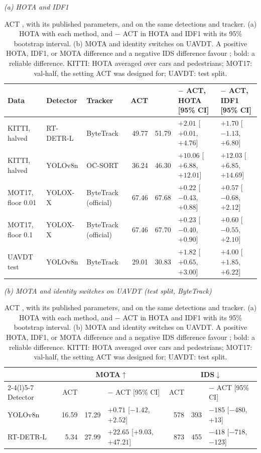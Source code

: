 \begin{table}[!tp]
\caption{ACT \cite{act2026adaptive}, with its published parameters, and \scl{} on the same detections and tracker. (a) HOTA with each method, and \scl{} $-$ ACT in HOTA and IDF1 with its 95\% bootstrap interval. (b) MOTA and identity switches on UAVDT. A positive HOTA, IDF1, or MOTA difference and a negative IDS difference favour \scl{}; bold: a reliable difference. KITTI: HOTA averaged over cars and pedestrians; MOT17: val-half, the setting ACT was designed for; UAVDT: test split.}
\label{tab:act}
\centering\footnotesize
\setlength{\tabcolsep}{3pt}
{\textit{(a) HOTA and IDF1}}\par\smallskip
\begin{tabular}{@{}lllrrll@{}}
\toprule
Data & Detector & Tracker & ACT & \scl{} & \scl{} $-$ ACT, HOTA [95\% CI] & \scl{} $-$ ACT, IDF1 [95\% CI]\\
\midrule
KITTI, halved & RT-DETR-L & ByteTrack & 49.77 & 51.79 & {\boldmath $+2.01$ [$+0.01$, $+4.76$]} & $+1.70$ [$-1.13$, $+6.80$]\\
KITTI, halved & YOLOv8n & OC-SORT & 36.24 & 46.30 & {\boldmath $+10.06$ [$+6.88$, $+12.01$]} & {\boldmath $+12.03$ [$+6.85$, $+14.69$]}\\
\addlinespace[2pt]
MOT17, floor 0.01 & YOLOX-X & ByteTrack (official) & 67.46 & 67.68 & $+0.22$ [$-0.43$, $+0.88$] & $+0.57$ [$-0.68$, $+2.12$]\\
MOT17, floor 0.1 & YOLOX-X & ByteTrack (official) & 67.46 & 67.70 & $+0.23$ [$-0.40$, $+0.90$] & $+0.60$ [$-0.55$, $+2.10$]\\
\addlinespace[2pt]
UAVDT test & YOLOv8n & ByteTrack & 29.01 & 30.83 & {\boldmath $+1.82$ [$+0.65$, $+3.00$]} & {\boldmath $+4.00$ [$+1.85$, $+6.22$]}\\
\bottomrule
\end{tabular}

\medskip
{\textit{(b) MOTA and identity switches on UAVDT (test split, ByteTrack)}}\par\smallskip
\begin{tabular}{@{}lrrlrrl@{}}
\toprule
 & \multicolumn{3}{c}{MOTA$\uparrow$} & \multicolumn{3}{c}{IDS$\downarrow$}\\
\cmidrule(lr){2-4}\cmidrule(l){5-7}
Detector & ACT & \scl{} & \scl{} $-$ ACT [95\% CI] & ACT & \scl{} & \scl{} $-$ ACT [95\% CI]\\
\midrule
YOLOv8n & 16.59 & 17.29 & $+0.71$ [$-1.42$, $+2.52$] & 578 & 393 & $-185$ [$-480$, $+13$]\\
RT-DETR-L & 5.34 & 27.99 & {\boldmath $+22.65$ [$+9.03$, $+47.21$]} & 873 & 455 & {\boldmath $-418$ [$-718$, $-123$]}\\
\bottomrule
\end{tabular}
\end{table}
